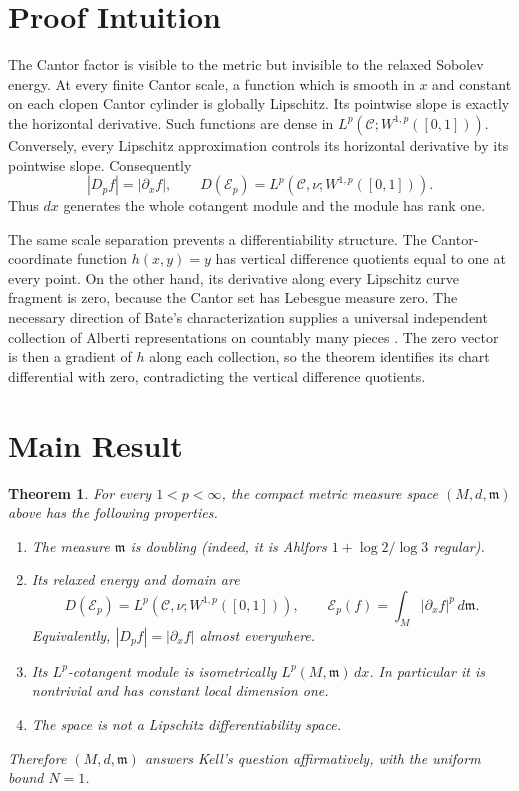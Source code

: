 \documentclass[11pt]{article}
\newtheorem{theorem}{Theorem}
\newcommand{\Ccal}{\mathcal C}
\newcommand{\E}{\mathcal E}
\newcommand{\m}{\mathfrak m}
\begin{document}
\section*{Proof Intuition}

The Cantor factor is visible to the metric but invisible to the relaxed
Sobolev energy.  At every finite Cantor scale, a function which is smooth in
$x$ and constant on each clopen Cantor cylinder is globally Lipschitz.  Its
pointwise slope is exactly the horizontal derivative.  Such functions are
dense in $L^p(\Ccal;W^{1,p}([0,1]))$.  Conversely, every Lipschitz
approximation controls its horizontal derivative by its pointwise slope.
Consequently
\[
       |D_pf|=|\partial_xf|,
       \qquad
       D(\E_p)=L^p(\Ccal,\nu;W^{1,p}([0,1])).
\]
Thus $dx$ generates the whole cotangent module and the module has rank one.

The same scale separation prevents a differentiability structure.  The
Cantor-coordinate function $h(x,y)=y$ has vertical difference quotients
equal to one at every point.  On the other hand, its derivative along every
Lipschitz curve fragment is zero, because the Cantor set has Lebesgue measure
zero.  The necessary direction of Bate's characterization supplies a
universal independent collection of Alberti representations on countably
many pieces \cite[Theorem 7.8]{Bate}.  The zero vector is then a gradient of
$h$ along each collection, so the theorem identifies its chart differential
with zero, contradicting the vertical difference quotients.

\section*{Main Result}

\begin{theorem}\label{thm:main}
For every $1<p<\infty$, the compact metric measure space
$(M,d,\m)$ above has the following properties.
\begin{enumerate}
\item The measure $\m$ is doubling (indeed, it is Ahlfors
$1+\log 2/\log 3$ regular).
\item Its relaxed energy and domain are
\begin{equation}\label{eq:energy}
 D(\E_p)=L^p(\Ccal,\nu;W^{1,p}([0,1])),
 \qquad
 \E_p(f)=\int_M|\partial_xf|^p\,d\m.
\end{equation}
Equivalently, $|D_pf|=|\partial_xf|$ almost everywhere.
\item Its $L^p$-cotangent module is isometrically
$L^p(M,\m)\,dx$.  In particular it is nontrivial and has constant local
dimension one.
\item The space is not a Lipschitz differentiability space.
\end{enumerate}
Therefore $(M,d,\m)$ answers Kell's question affirmatively, with the uniform
bound $N=1$.
\end{theorem}
\end{document}
